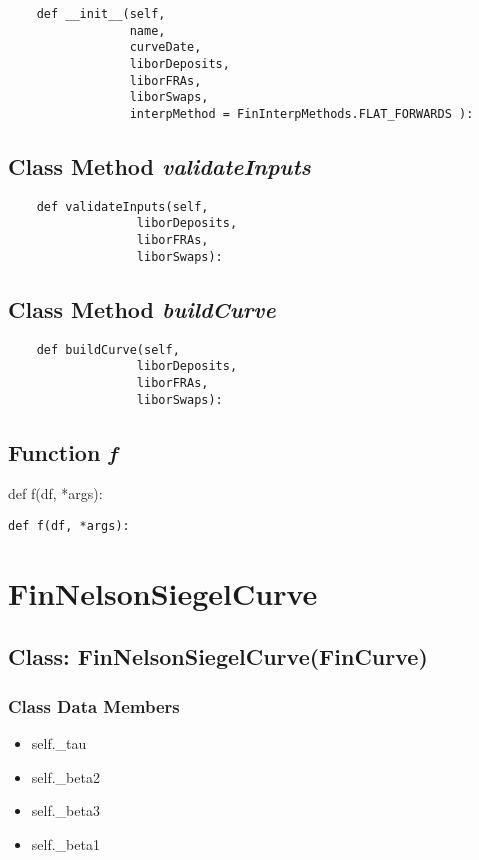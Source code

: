 \documentclass[twoside,11pt]{book}
\begin{document}
\begin{lstlisting}
    def __init__(self, 
                 name, 
                 curveDate, 
                 liborDeposits,
                 liborFRAs,
                 liborSwaps,
                 interpMethod = FinInterpMethods.FLAT_FORWARDS ):
\end{lstlisting}

\subsection{Class Method {\it validateInputs}}


\begin{lstlisting}
    def validateInputs(self,
                  liborDeposits,
                  liborFRAs,
                  liborSwaps):
\end{lstlisting}

\subsection{Class Method {\it buildCurve}}


\begin{lstlisting}
    def buildCurve(self,
                  liborDeposits,
                  liborFRAs,
                  liborSwaps):
\end{lstlisting}

\subsection{Function {\it f}}
def f(df, *args):

\begin{lstlisting}
def f(df, *args):
\end{lstlisting}

\newpage
\section{FinNelsonSiegelCurve}

\subsection{Class: FinNelsonSiegelCurve(FinCurve)}


\subsubsection{Class Data Members}
\begin{itemize}
\item{self.\_tau}
\item{self.\_beta2}
\item{self.\_beta3}
\item{self.\_beta1}
\end{itemize}
\end{document}
